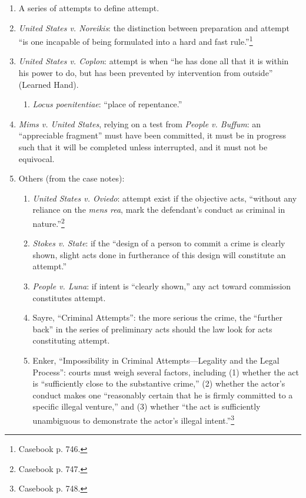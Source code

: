 \begin{enumerate}
    \item A series of attempts to define attempt.
    \item \emph{United States v. Noreikis}: the distinction between 
    preparation and attempt ``is one incapable of being formulated into a hard 
    and fast rule.''\footnote{Casebook p. 746.}
    \item \emph{United States v. Coplon}: attempt is when ``he has done all 
    that it is within his power to do, but has been prevented by intervention 
    from outside'' (Learned Hand).
    \begin{enumerate}
        \item \emph{Locus poenitentiae}: ``place of repentance.''
    \end{enumerate}
    \item \emph{Mims v. United States}, relying on a test from \emph{People v.  
    Buffum}: an ``appreciable fragment'' must have been committed, it must be 
    in progress such that it will be completed unless interrupted, and it must 
    not be equivocal.
    \item Others (from the case notes):
    \begin{enumerate}
        \item \emph{United States v. Oviedo}: attempt exist if the objective 
        acts, ``without any reliance on the \emph{mens rea}, mark the 
        defendant's conduct as criminal in nature.''\footnote{Casebook p. 
        747.}
        \item \emph{Stokes v. State}: if the ``design of a person to commit a 
        crime is clearly shown, slight acts done in furtherance of this design 
        will constitute an attempt.''
        \item \emph{People v. Luna}: if intent is ``clearly shown,'' any act 
        toward commission constitutes attempt.
        \item Sayre, ``Criminal Attempts'': the more serious the crime, the 
        ``further back'' in the series of preliminary acts should the law look 
        for acts constituting attempt.
        \item Enker, ``Impossibility in Criminal Attempts---Legality and the 
        Legal Process'': courts must weigh several factors, including (1) 
        whether the act is ``sufficiently close to the substantive crime,'' 
        (2) whether the actor's conduct makes one ``reasonably certain that he 
        is firmly committed to a specific illegal venture,'' and (3) whether 
        ``the act is sufficiently unambiguous to demonstrate the actor's 
        illegal intent.''\footnote{Casebook p. 748.}
    \end{enumerate}
\end{enumerate}


